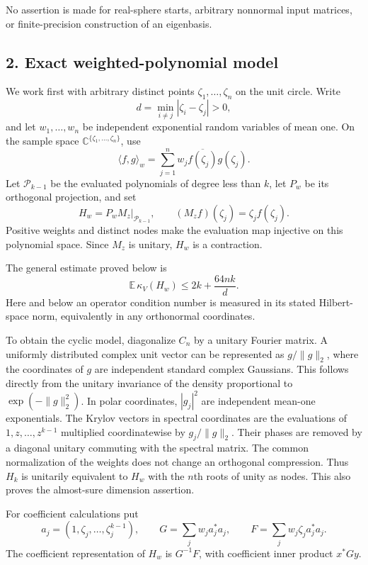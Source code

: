 \documentclass[
  11pt,
]{article}
\begin{document}
No assertion is made for real-sphere starts, arbitrary nonnormal input
matrices, or finite-precision construction of an eigenbasis.

\subsection{2. Exact weighted-polynomial
model}\label{exact-weighted-polynomial-model}

We work first with arbitrary distinct points \(\zeta_1,\ldots,\zeta_n\)
on the unit circle. Write \[
d=\min_{i\ne j}|\zeta_i-\zeta_j|>0,
\] and let \(w_1,\ldots,w_n\) be independent exponential random
variables of mean one. On the sample space
\(\mathbb C^{\{\zeta_1,\ldots,\zeta_n\}}\), use \[
\langle f,g\rangle_w=\sum_{j=1}^n w_j\overline{f(\zeta_j)}g(\zeta_j).
\] Let \(\mathcal P_{k-1}\) be the evaluated polynomials of degree less
than \(k\), let \(P_w\) be its orthogonal projection, and set \[
H_w=P_wM_z\big|_{\mathcal P_{k-1}},\qquad (M_zf)(\zeta_j)=\zeta_jf(\zeta_j).
\] Positive weights and distinct nodes make the evaluation map injective
on this polynomial space. Since \(M_z\) is unitary, \(H_w\) is a
contraction.

The general estimate proved below is \[
\mathbb E\,\kappa_V(H_w)\leq2k+\frac{64nk}{d}. \tag{3}
\] Here and below an operator condition number is measured in its stated
Hilbert-space norm, equivalently in any orthonormal coordinates.

To obtain the cyclic model, diagonalize \(C_n\) by a unitary Fourier
matrix. A uniformly distributed complex unit vector can be represented
as \(g/\|g\|_2\), where the coordinates of \(g\) are independent
standard complex Gaussians. This follows directly from the unitary
invariance of the density proportional to \(\exp(-\|g\|_2^2)\). In polar
coordinates, \(|g_j|^2\) are independent mean-one exponentials. The
Krylov vectors in spectral coordinates are the evaluations of
\(1,z,\ldots,z^{k-1}\) multiplied coordinatewise by \(g_j/\|g\|_2\).
Their phases are removed by a diagonal unitary commuting with the
spectral matrix. The common normalization of the weights does not change
an orthogonal compression. Thus \(H_k\) is unitarily equivalent to
\(H_w\) with the \(n\)th roots of unity as nodes. This also proves the
almost-sure dimension assertion.

For coefficient calculations put \[
a_j=(1,\zeta_j,\ldots,\zeta_j^{k-1}),\qquad
G=\sum_jw_ja_j^*a_j,\qquad F=\sum_jw_j\zeta_ja_j^*a_j.
\] The coefficient representation of \(H_w\) is \(G^{-1}F\), with
coefficient inner product \(x^*Gy\).
\end{document}
